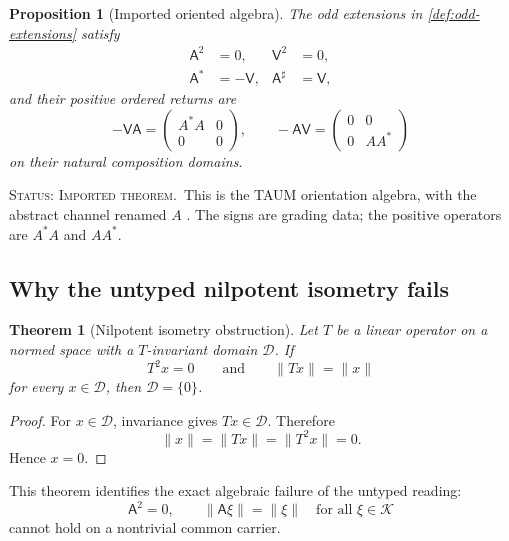 \documentclass[11pt,reqno]{scrartcl}
\newcommand{\scrK}{\mathscr K}
\newcommand{\Aodd}{\mathsf A}
\newcommand{\Vodd}{\mathsf V}
\newcommand{\statuslabel}[1]{\par\smallskip\noindent\textsc{Status: #1.}\ }
\theoremstyle{plain}
\newtheorem{theorem}{Theorem}[section]
\newtheorem{proposition}[proposition]{Proposition}
\theoremstyle{definition}
\theoremstyle{remark}
\begin{document}
\begin{proposition}[Imported oriented algebra]
\label{prop:imported-algebra}
The odd extensions in \cref{def:odd-extensions} satisfy
\begin{align}
  \Aodd^2&=0,
  &\Vodd^2&=0,
  \label{eq:odd-nilpotency}\\
  \Aodd^*&=-\Vodd,
  &\Aodd^{\sharp}&=\Vodd,
  \label{eq:odd-adjoints}
\end{align}
and their positive ordered returns are
\begin{equation}
  -\Vodd\Aodd
  =\begin{pmatrix}A^*A&0\\0&0\end{pmatrix},
  \qquad
  -\Aodd\Vodd
  =\begin{pmatrix}0&0\\0&AA^*\end{pmatrix}
  \label{eq:positive-returns}
\end{equation}
on their natural composition domains.
\end{proposition}

\statuslabel{Imported theorem}This is the TAUM orientation algebra, with the
abstract channel renamed \(A\) \cite{TAUM2026}.  The signs are grading data;
the positive operators are \(A^*A\) and \(AA^*\).

\subsection{Why the untyped nilpotent isometry fails}

\begin{theorem}[Nilpotent isometry obstruction]
\label{thm:nilpotent-isometry-obstruction}
Let \(T\) be a linear operator on a normed space with a \(T\)-invariant domain
\(\mathcal D\).  If
\begin{equation}
  T^2x=0
  \qquad\text{and}\qquad
  \|Tx\|=\|x\|
  \label{eq:nilpotent-isometry-hyp}
\end{equation}
for every \(x\in\mathcal D\), then \(\mathcal D=\{0\}\).
\end{theorem}

\begin{proof}
For \(x\in\mathcal D\), invariance gives \(Tx\in\mathcal D\).  Therefore
\begin{equation}
  \|x\|=\|Tx\|=\|T^2x\|=0.
\end{equation}
Hence \(x=0\).
\end{proof}

This theorem identifies the exact algebraic failure of the untyped reading:
\begin{equation}
  \Aodd^2=0,
  \qquad
  \|\Aodd\xi\|=\|\xi\|
  \quad\text{for all }\xi\in\scrK
  \label{eq:forbidden-global}
\end{equation}
cannot hold on a nontrivial common carrier.
\end{document}
